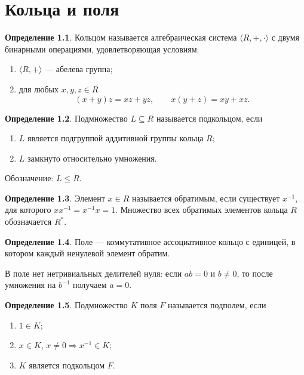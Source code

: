 \documentclass[12pt,a4paper,oneside,openany]{book}
\theoremstyle{definition}
\newtheorem{definition}{Определение}[chapter]
\theoremstyle{plain}
\theoremstyle{remark}
\begin{document}
\chapter{Кольца и поля}

\begin{definition}
Кольцом называется алгебраическая система $\langle R,+,\cdot\rangle$ с
двумя бинарными операциями, удовлетворяющая условиям:
\begin{enumerate}[label=\arabic*)]
  \item $\langle R,+\rangle$ --- абелева группа;
  \item для любых $x,y,z\in R$
  \[
    (x+y)z=xz+yz,
    \qquad
    x(y+z)=xy+xz.
  \]
\end{enumerate}
\end{definition}

\begin{definition}
Подмножество $L\subseteq R$ называется подкольцом, если
\begin{enumerate}[label=\arabic*)]
  \item $L$ является подгруппой аддитивной группы кольца $R$;
  \item $L$ замкнуто относительно умножения.
\end{enumerate}
Обозначение: $L\leq R$.
\end{definition}

\begin{definition}
Элемент $x\in R$ называется обратимым, если существует $x^{-1}$, для
которого $xx^{-1}=x^{-1}x=1$. Множество всех обратимых элементов кольца
$R$ обозначается $R^*$.
\end{definition}

\begin{definition}
Поле --- коммутативное ассоциативное кольцо с единицей, в котором каждый
ненулевой элемент обратим.
\end{definition}

В поле нет нетривиальных делителей нуля: если $ab=0$ и $b\ne0$, то после
умножения на $b^{-1}$ получаем $a=0$.

\begin{definition}
Подмножество $K$ поля $F$ называется подполем, если
\begin{enumerate}[label=\arabic*)]
  \item $1\in K$;
  \item $x\in K$, $x\ne0\Rightarrow x^{-1}\in K$;
  \item $K$ является подкольцом $F$.
\end{enumerate}
\end{definition}
\end{document}
